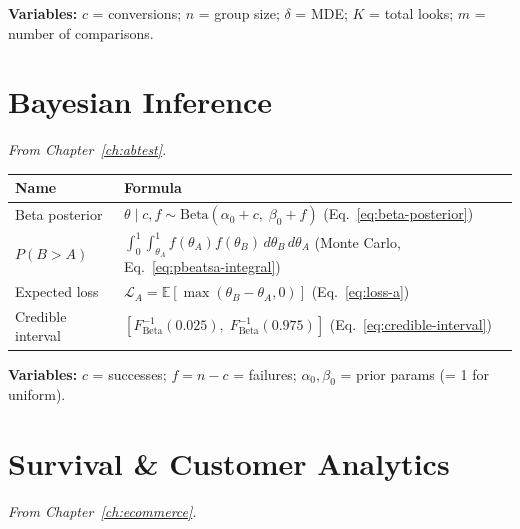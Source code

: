 \medskip
\noindent\textbf{Variables:} $c$ = conversions; $n$ = group size; $\delta$ = MDE; $K$ = total looks; $m$ = number of comparisons.

\section{Bayesian Inference}

\noindent\textit{From Chapter~\ref{ch:abtest}.}

\medskip

\begin{tabularx}{\textwidth}{lX}
\toprule
\textbf{Name} & \textbf{Formula} \\
\midrule
Beta posterior &
$\theta \mid c, f \sim \text{Beta}(\alpha_0 + c,\; \beta_0 + f)$
\quad (Eq.~\ref{eq:beta-posterior}) \\[8pt]

$P(B > A)$ &
$\displaystyle \int_0^1\!\int_{\theta_A}^{1} f(\theta_A) f(\theta_B)\,d\theta_B\,d\theta_A$
\quad (Monte Carlo, Eq.~\ref{eq:pbeatsa-integral}) \\[12pt]

Expected loss &
$\mathcal{L}_A = \mathbb{E}[\max(\theta_B - \theta_A, 0)]$
\quad (Eq.~\ref{eq:loss-a}) \\[8pt]

Credible interval &
$[F^{-1}_{\text{Beta}}(0.025),\; F^{-1}_{\text{Beta}}(0.975)]$
\quad (Eq.~\ref{eq:credible-interval}) \\
\bottomrule
\end{tabularx}

\medskip
\noindent\textbf{Variables:} $c$ = successes; $f = n - c$ = failures; $\alpha_0, \beta_0$ = prior params (= 1 for uniform).

\section{Survival \& Customer Analytics}

\noindent\textit{From Chapter~\ref{ch:ecommerce}.}

\medskip

